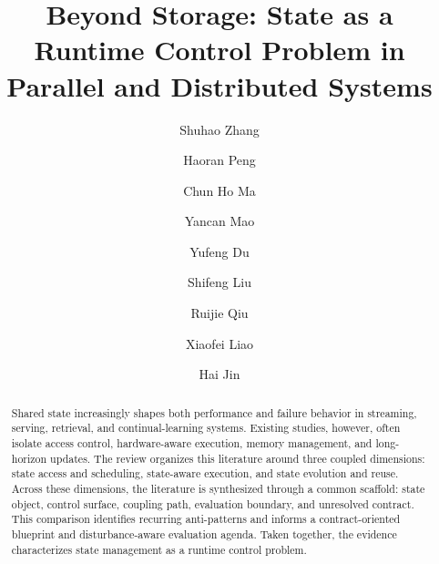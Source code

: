 \documentclass[manuscript]{acmart}
\begin{document}
\title{Beyond Storage: State as a Runtime Control Problem in Parallel and Distributed Systems}

\author{Shuhao Zhang}

\author{Haoran Peng}

\author{Chun Ho Ma}

\author{Yancan Mao}

\author{Yufeng Du}

\author{Shifeng Liu}

\author{Ruijie Qiu}

\author{Xiaofei Liao}

\author{Hai Jin}

\begin{abstract}
Shared state increasingly shapes both performance and failure behavior in streaming, serving, retrieval, and continual-learning systems. Existing studies, however, often isolate access control, hardware-aware execution, memory management, and long-horizon updates. The review organizes this literature around three coupled dimensions: state access and scheduling, state-aware execution, and state evolution and reuse. Across these dimensions, the literature is synthesized through a common scaffold: state object, control surface, coupling path, evaluation boundary, and unresolved contract. This comparison identifies recurring anti-patterns and informs a contract-oriented blueprint and disturbance-aware evaluation agenda. Taken together, the evidence characterizes state management as a runtime control problem.
\end{abstract}
\end{document}
